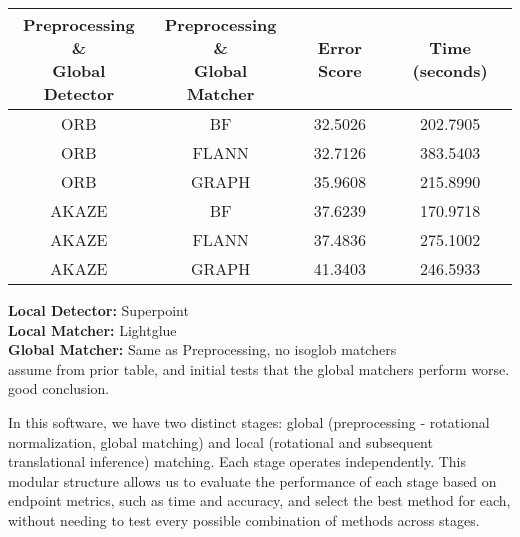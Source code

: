 \begin{table}[H]
    \centering
    \begin{tabular}{|c|c|c|c|}
    \hline
    \makecell{\textbf{Preprocessing \&} \\ \textbf{Global Detector}} & \makecell{\textbf{Preprocessing \&} \\ \textbf{Global Matcher}} & \textbf{Error Score} & \textbf{Time (seconds)} \\ \hline
    ORB   & BF    & 32.5026 & 202.7905 \\ \hline
    ORB   & FLANN & 32.7126 & 383.5403 \\ \hline
    ORB   & GRAPH & 35.9608 & 215.8990 \\ \hline
    AKAZE & BF    & 37.6239 & 170.9718 \\ \hline
    AKAZE & FLANN & 37.4836 & 275.1002 \\ \hline
    AKAZE & GRAPH & 41.3403 & 246.5933 \\ \hline
    \end{tabular}
\end{table}

    
\textbf{Local Detector:} Superpoint \\
\textbf{Local Matcher:} Lightglue \\
\textbf{Global Matcher:} Same as Preprocessing, no isoglob matchers \\
    



assume from prior table, and initial tests that the global matchers perform worse. good conclusion. 


In this software, we have two distinct stages: global (preprocessing - rotational normalization, global matching) and local (rotational and subsequent translational inference) matching. Each stage operates independently. This modular structure allows us to evaluate the performance of each stage based on endpoint metrics, such as time and accuracy, and select the best method for each, without needing to test every possible combination of methods across stages.

